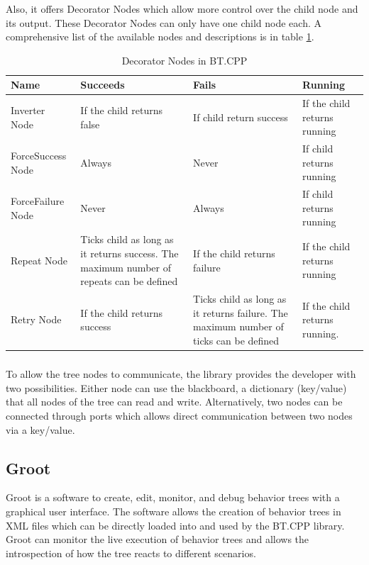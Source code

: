 Also, it offers Decorator Nodes which allow more control over the child node and its output. These Decorator Nodes can only have one child node each. A comprehensive list of the available nodes and descriptions is in table \ref{tab:decorators_bt}.

\begin{center}
\begin{table}[ht]
	\caption{Decorator Nodes in BT.CPP}
	\label{tab:decorators_bt}
	\begin{tabular}{ | m{} | m{}| m{} | m{} |} 
  	\hline
  	\textbf{Name} & \textbf{Succeeds} & \textbf{Fails} & \textbf{Running} \\ 
  	\hline
  	Inverter Node & If the child returns false & If child return success &  If the child returns running \\ 
  	\hline
  	ForceSuccess Node & Always & Never & If child returns running \\ 
  	\hline
  	ForceFailure Node & Never & Always & If child returns running\\
  	\hline
  	Repeat Node & Ticks child as long as it returns success. The maximum number of repeats can be defined & If the child returns failure & If the child returns running \\
  	\hline  	
  	Retry Node & If the child returns success & Ticks child as long as it returns failure. The maximum number of ticks can be defined & If the child returns running. \\
  	\hline
	\end{tabular}
\end{table}
\end{center}

\subparagraph*{}
To allow the tree nodes to communicate, the library provides the developer with two possibilities. Either node can use the blackboard, a dictionary (key/value) that all nodes of the tree can read and write. Alternatively, two nodes can be connected through ports which allows direct communication between two nodes via a key/value.

\subsection{Groot}

Groot is a software to create, edit, monitor, and debug behavior trees with a graphical user interface. The software allows the creation of behavior trees in XML files which can be directly loaded into and used by the BT.CPP library. Groot can monitor the live execution of behavior trees and allows the introspection of how the tree reacts to different scenarios.

